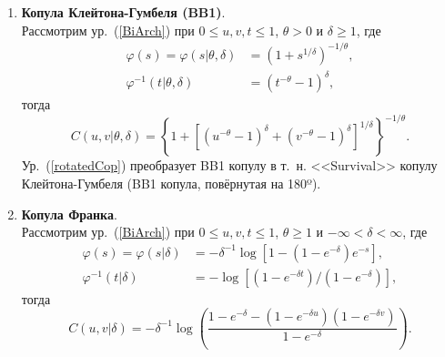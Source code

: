 \begin{enumerate}
\item \textbf{Копула Клейтона-Гумбеля (BB1)}.\\
Рассмотрим ур.~(\ref{BiArch}) при $0 \le u,v,t \le 1$, $\theta > 0$ и $\delta \ge 1$, где
\begin{equation}
\begin{aligned}
    \varphi (s) = \varphi(s| \theta, \delta) &= (1 + s^{1/\delta})^{-1/\theta}, \\ 
    \varphi^{-1}(t| \theta, \delta) &= (t^{-\theta} - 1)^\delta,
\end{aligned} \nonumber 
\end{equation}
тогда
\begin{equation}
    C(u,v|\theta,\delta) = \left\{1 + [(u^{-\theta} - 1)^\delta + (v^{-\theta} - 1)^\delta]^{1/\delta} \right\}^{-1/\theta}. \nonumber
\end{equation}
Ур.~(\ref{rotatedCop}) преобразует BB1 копулу в т.~н. <<Survival>> копулу Клейтона-Гумбеля (BB1 копула, повёрнутая на 180º).


\item \textbf{Копула Франка}.\\
Рассмотрим ур.~(\ref{BiArch}) при $0 \le u,v,t \le 1$, $\theta \ge 1$ и $-\infty < \delta < \infty$, где
\begin{equation}
\begin{aligned}
    \varphi (s) = \varphi(s| \delta) &= -\delta^{-1}\log{[1-(1-e^{-\delta})e^{-s}]}, \\
    \varphi^{-1}(t| \delta) &= -\log{[(1-e^{-\delta t})/(1-e^{-\delta})]},
\end{aligned} \nonumber 
\end{equation}
тогда
\begin{equation}
    C(u,v|\delta) = -\delta^{-1} \log{\left(\frac{1 - e^{-\delta} - (1 - e^{-\delta u})(1 - e^{-\delta v})}{1 - e^{-\delta}}\right)}. \nonumber
    \end{equation}


\end{enumerate}
